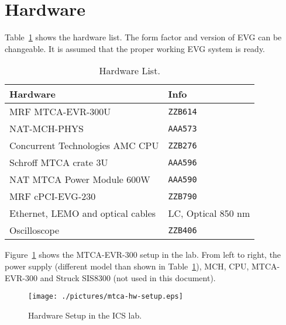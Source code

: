 \documentclass[11pt
  , a4paper
  , article
  , oneside
  , showtrims
]{memoir}
\begin{document}
\section{Hardware}
Table~\ref{table:hwlist} shows the hardware list. The form factor and version of EVG can be changeable. It is assumed that the proper working EVG system is ready.
\begin{table}[!hb]
  \centering
  \begin{tabular}{l|l}
    \toprule
    Hardware                          & Info               \\\midrule
    MRF MTCA-EVR-300U                 & \texttt{ZZB614}    \\\midrule
    NAT-MCH-PHYS                      & \texttt{AAA573}    \\\midrule
    Concurrent Technologies AMC CPU   & \texttt{ZZB276}    \\\midrule
    Schroff MTCA crate 3U             & \texttt{AAA596}    \\\midrule
    NAT MTCA Power Module 600W        & \texttt{AAA590}    \\\midrule
    MRF cPCI-EVG-230                  & \texttt{ZZB790}    \\\midrule
    Ethernet, LEMO and optical cables & LC, Optical 850 nm \\\midrule
    Oscilloscope                      & \texttt{ZZB406}    \\\bottomrule
  \end{tabular}
  \caption[]{Hardware List.}
  \label{table:hwlist}
\end{table}

Figure~\ref{fig:mtca-hw-setup} shows the MTCA-EVR-300 setup in the lab. From left to right, the power supply (different model than shown in Table~\ref{table:hwlist}), MCH, CPU, MTCA-EVR-300 and Struck SIS8300 (not used in this document).
\begin{figure}[!b]
  \centering
  \texttt{[image: ./pictures/mtca-hw-setup.eps]}
  \caption{Hardware Setup in the ICS lab.}
  \label{fig:mtca-hw-setup}
\end{figure}


\clearpage
\end{document}
